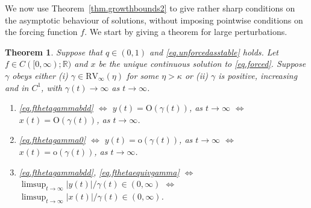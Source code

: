 \documentclass[a4paper,10pt,reqno]{amsart}
\numberwithin{equation}{section}
\newtheorem{theorem}{Theorem}
\theoremstyle{definition}
\theoremstyle{remark}
\DeclareMathOperator{\1}{\mathbbm 1}
\begin{document}
We now use Theorem~\ref{thm.growthbounds2} to give rather sharp conditions on the asymptotic behaviour of solutions, without imposing pointwise conditions on the forcing function $f$. We start by giving a theorem for large perturbations. 
\begin{theorem}\label{thm.detlargepert}
	Suppose that $q\in (0,1)$ and \eqref{eq.unforcedasstable} holds. Let $f\in C([0,\infty);\mathbb{R})$ and $x$ be the unique continuous solution to \eqref{eq.forced}. Suppose $\gamma$ obeys either (i) $\gamma\in \text{RV}_\infty(\eta)$ for some $\eta>\kappa$ or (ii) $\gamma$ is positive, increasing and in $C^1$, with $\gamma(t)\to\infty$ as $t\to\infty$. 
	\begin{enumerate}
		\item[(I)]
		\eqref{eq.fthetagammabdd} $\Longleftrightarrow$ 
		$y(t)=\text{O}(\gamma(t))$, as $t\to\infty$
		$\Longleftrightarrow$ 
		$x(t)=\text{O}(\gamma(t))$, as $t\to\infty$. 
		\item[(II)] 
		\eqref{eq.fthetagamma0}  $\Longleftrightarrow$  
		$y(t)=\text{o}(\gamma(t))$, as $t\to\infty$ 
		$\Longleftrightarrow$  
		$x(t)=\text{o}(\gamma(t))$, as $t\to\infty$. 
		\item[(III)] \eqref{eq.fthetagammabdd}, \eqref{eq.fthetaequivgamma} 
		$\Leftrightarrow$ 
		$\limsup_{t\to\infty} |y(t)|/\gamma(t)\in (0,\infty)$
		$\Leftrightarrow$ 
		$\limsup_{t\to\infty} |x(t)|/\gamma(t)\in (0,\infty)$.
	\end{enumerate}
	\end{theorem}
\end{document}
